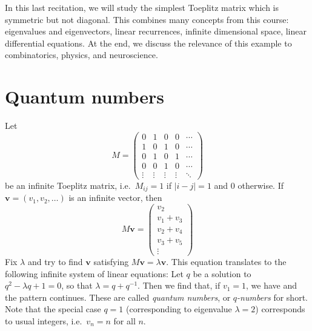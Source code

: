 \documentclass[10pt]{amsart}
\theoremstyle{mythm}
\theoremstyle{definition}
\theoremstyle{myrmk}
\begin{document}
	\thispagestyle{fancy}
	
	In this last recitation, we will study the simplest Toeplitz matrix which is symmetric but not diagonal. This combines many concepts from this course: eigenvalues and eigenvectors, linear recurrences, infinite dimensional space, linear differential equations. At the end, we discuss the relevance of this example to combinatorics, physics, and neuroscience. 
	
	\section{Quantum numbers} 
	
	Let 
	\[
		M = \begin{pmatrix}
		0 & 1 & 0 & 0 & \cdots \\
		1 & 0 & 1 & 0 & \cdots \\
		0 & 1 & 0 & 1 & \cdots \\
		0 & 0 & 1 & 0 & \cdots \\
		\vdots & \vdots  & \vdots  & \vdots  & \ddots
		\end{pmatrix}
	\]
	be an infinite Toeplitz matrix, i.e.\ $M_{ij} = 1$ if $|i-j| = 1$ and $0$ otherwise. If $\bm{v} = (v_1, v_2, \ldots)$ is an infinite vector, then 
	\[
		M \bm{v} = \begin{pmatrix}
		v_2 \\ v_1 + v_3 \\ v_2 + v_4 \\ v_3 + v_5 \\ \vdots
		\end{pmatrix}
	\]
	Fix $\lambda$ and try to find $\bm{v}$ satisfying $M \bm{v} = \lambda \bm{v}$. This equation translates to the following infinite system of linear equations: 
	Let $q$ be a solution to $q^2 - \lambda q + 1 = 0$, so that $\lambda = q + q^{-1}$. Then we find that, if $v_1 = 1$, we have 
	and the pattern continues. These are called \emph{quantum numbers}, or \emph{$q$-numbers} for short. Note that the special case $q = 1$ (corresponding to eigenvalue $\lambda = 2$) corresponds to usual integers, i.e.\ $v_n = n$ for all $n$. 
	
\end{document}
